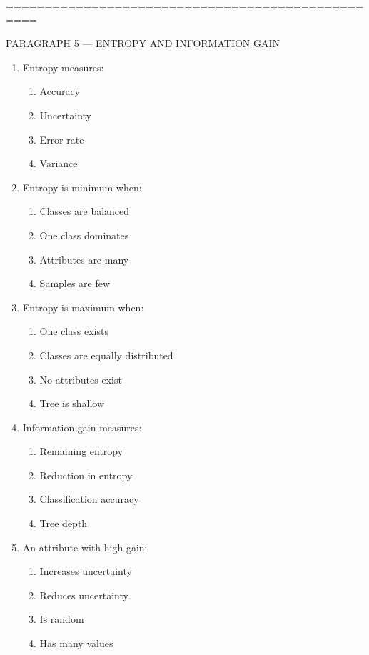 \documentclass[3pt]{article}
\begin{document}
	==================================================
	
	PARAGRAPH 5 — ENTROPY AND INFORMATION GAIN
	
	\begin{enumerate}
		\item Entropy measures:
		\begin{enumerate}
			\item Accuracy
			\item Uncertainty
			\item Error rate
			\item Variance
		\end{enumerate}
		
		\item Entropy is minimum when:
		\begin{enumerate}
			\item Classes are balanced
			\item One class dominates
			\item Attributes are many
			\item Samples are few
		\end{enumerate}
		
		\item Entropy is maximum when:
		\begin{enumerate}
			\item One class exists
			\item Classes are equally distributed
			\item No attributes exist
			\item Tree is shallow
		\end{enumerate}
		
		\item Information gain measures:
		\begin{enumerate}
			\item Remaining entropy
			\item Reduction in entropy
			\item Classification accuracy
			\item Tree depth
		\end{enumerate}
		
		\item An attribute with high gain:
		\begin{enumerate}
			\item Increases uncertainty
			\item Reduces uncertainty
			\item Is random
			\item Has many values
		\end{enumerate}
		

\end{enumerate}
\end{document}
